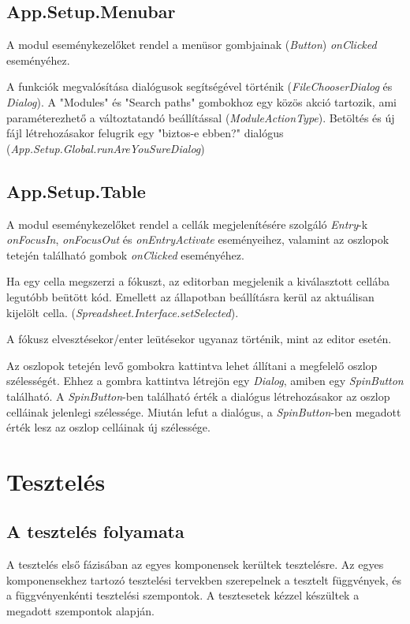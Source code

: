 \subsection{App.Setup.Menubar}

A modul eseménykezelőket rendel a menüsor gombjainak (\textit{Button}) \textit{onClicked} eseményéhez.

A funkciók megvalósítása dialógusok segítségével történik (\textit{FileChooserDialog} és \textit{Dialog}). A "Modules" és "Search paths" gombokhoz egy közös akció tartozik, ami paraméterezhető a változtatandó beállítással (\textit{ModuleActionType}). Betöltés és új fájl létrehozásakor felugrik egy "biztos-e ebben?" dialógus \mbox{(\textit{App.Setup.Global.runAreYouSureDialog})}

\subsection{App.Setup.Table}

A modul eseménykezelőket rendel a cellák megjelenítésére szolgáló \textit{Entry}-k \textit{onFocusIn}, \textit{onFocusOut} és \textit{onEntryActivate} eseményeihez, valamint az oszlopok tetején található gombok \textit{onClicked} eseményéhez.

Ha egy cella megszerzi a fókuszt, az editorban megjelenik a kiválasztott cellába legutóbb beütött kód. Emellett az állapotban beállításra kerül az aktuálisan kijelölt cella. (\textit{Spreadsheet.Interface.setSelected}).

A fókusz elvesztésekor/enter leütésekor ugyanaz történik, mint az editor esetén.

Az oszlopok tetején levő gombokra kattintva lehet állítani a megfelelő oszlop szélességét. Ehhez a gombra kattintva létrejön egy \textit{Dialog}, amiben egy \textit{SpinButton} található. A \textit{SpinButton}-ben található érték a dialógus létrehozásakor az oszlop celláinak jelenlegi szélessége. Miután lefut a dialógus, a \textit{SpinButton}-ben megadott érték lesz az oszlop celláinak új szélessége.

\section{Tesztelés}

\subsection{A tesztelés folyamata}

A tesztelés első fázisában az egyes komponensek kerültek tesztelésre. Az egyes komponensekhez tartozó tesztelési tervekben szerepelnek a tesztelt függvények, és a függvényenkénti tesztelési szempontok. A tesztesetek kézzel készültek a megadott szempontok alapján. 

